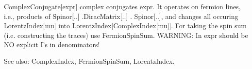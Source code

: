 ComplexConjugate[expr] complex conjugates expr. It operates on fermion lines, i.e., products of Spinor[..] .DiracMatrix[..] . Spinor[..],
  and changes all occuring LorentzIndex[mu] into LorentzIndex[ComplexIndex[mu]]. For taking the spin sum (i.e. constructing the traces)
  use FermionSpinSum. WARNING: In expr should be NO explicit I's in denominators!

See also:  ComplexIndex, FermionSpinSum, LorentzIndex.





















